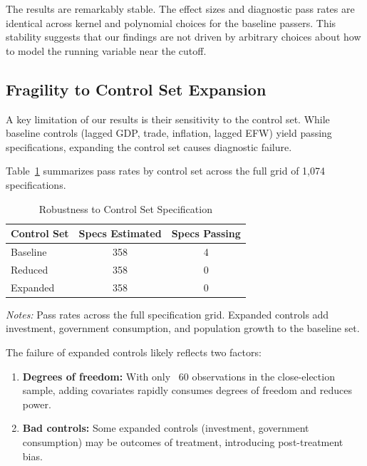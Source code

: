 \documentclass[12pt,a4paper]{article}
\begin{document}
The results are remarkably stable. The effect sizes and diagnostic pass 
rates are identical across kernel and polynomial choices for the baseline 
passers. This stability suggests that our findings are not driven by 
arbitrary choices about how to model the running variable near the cutoff.

\subsection{Fragility to Control Set Expansion}

A key limitation of our results is their sensitivity to the control set. 
While baseline controls (lagged GDP, trade, inflation, lagged EFW) yield 
passing specifications, expanding the control set causes diagnostic failure.

Table~\ref{tab:robustness_controls} summarizes pass rates by control set 
across the full grid of 1,074 specifications.

\begin{table}[H]
\centering
\caption{Robustness to Control Set Specification}
\label{tab:robustness_controls}
\begin{threeparttable}
\begin{tabular}{lcc}
\toprule
Control Set & Specs Estimated & Specs Passing \\
\midrule
Baseline & 358 & 4 \\
Reduced & 358 & 0 \\
Expanded & 358 & 0 \\
\bottomrule
\end{tabular}
\begin{tablenotes}
\small
\item \textit{Notes:} Pass rates across the full specification grid. 
Expanded controls add investment, government consumption, and population 
growth to the baseline set.
\end{tablenotes}
\end{threeparttable}
\end{table}

The failure of expanded controls likely reflects two factors:
\begin{enumerate}
    \item \textbf{Degrees of freedom:} With only ~60 observations in the 
    close-election sample, adding covariates rapidly consumes degrees of 
    freedom and reduces power.
    \item \textbf{Bad controls:} Some expanded controls (investment, 
    government consumption) may be outcomes of treatment, introducing 
    post-treatment bias.
\end{enumerate}
\end{document}
